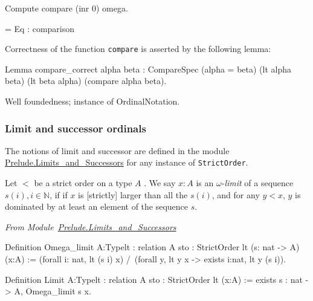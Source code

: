 \begin{Coqsrc}
Compute compare (inr 0) omega.  
\end{Coqsrc}
 
 \begin{Coqanswer}
= Eq : comparison
\end{Coqanswer}
 

Correctness of the function \texttt{compare} is asserted by the following lemma:

\begin{Coqsrc}
Lemma compare_correct alpha beta :
    CompareSpec (alpha = beta) (lt alpha beta) (lt beta alpha)
              (compare alpha beta).
\end{Coqsrc}


\begin{todo}
  Well foundedness; instance of OrdinalNotation.
\end{todo}


\subsubsection{Limit and successor ordinals}

The notions of limit and successor are defined in the module 
\href{../src/html/hydras.Prelude.Limits_and_Successors.html}{Prelude.Limits\_and\_Successors} for any instance of
\texttt{StrictOrder}.



Let $<$ be a strict order on a type $A$ .
We say $x:A$ is an  $\omega$-\emph{limit} of  a sequence $s(i), i\in\mathbb{N}$, if
 if $x$ is [strictly] larger than all the $s(i)$, and for any
$y<x$, $y$ is dominated by at least an element of  the sequence $s$.

\vspace{4pt}

\noindent\emph{From Module~\href{../src/html/hydras.Prelude.Limits_and_Successors.html}{Prelude.Limits\_and\_Successors}}

\begin{Coqsrc}
Definition  Omega_limit
            {A:Type}{lt : relation A}
           {sto : StrictOrder lt} (s: nat -> A) (x:A)  :=
  (forall i: nat, lt (s i) x) /\
  (forall y, lt y  x -> exists i:nat, lt y (s i)).

Definition Limit   {A:Type}{lt : relation A}
           {sto : StrictOrder lt}  (x:A)  :=
  exists s : nat -> A, Omega_limit s x.
 \end{Coqsrc}

